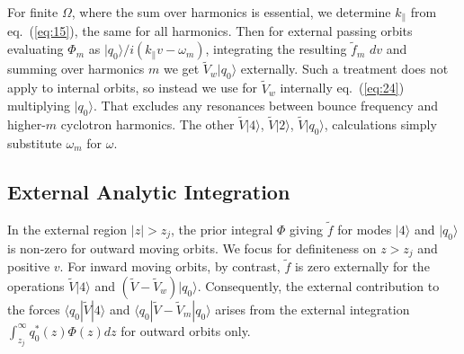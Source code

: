 \documentclass[12pt]{article}
\def\ket#1{|#1\rangle}
\def\bra#1{\langle#1}
\begin{document}
For finite $\Omega$, where the sum over harmonics is essential, we
determine $k_\parallel$ from eq.\ (\ref{eq:15}), the same for all
harmonics. Then for external passing orbits evaluating $\Phi_m$ as
$\ket{q_0}/i(k_\parallel v -\omega_m)$, integrating the resulting
$\tilde f_m$ $dv$ and summing over harmonics $m$ we get
$\tilde V_w\ket{q_0}$ externally. Such a treatment does not
apply to internal orbits, so instead we use for $\tilde V_w$ internally
eq.\ (\ref{eq:24}) multiplying $\ket{q_0}$. That excludes any resonances
between bounce frequency and higher-$m$ cyclotron harmonics. The other
$\tilde V\ket{4}$, $\tilde V\ket{2}$, $\tilde V\ket{q_0}$, calculations
simply substitute $\omega_m$ for $\omega$.

\subsection{External Analytic Integration}

In the external region $|z|>z_j$, the prior integral $\Phi$ giving
$\tilde f$ for modes $\ket{4}$ and $\ket{q_0}$ is non-zero for outward
moving orbits. We focus for definiteness on $z>z_j$ and positive $v$.
For inward moving orbits, by contrast, $\tilde f$ is zero externally for the
operations $\tilde V\ket{4}$ and $(\tilde V -\tilde
V_w)\ket{q_0}$. Consequently, the external contribution to the forces
$\bra{q_0}|\tilde V \ket{4}$ and $\bra{q_0}|\tilde V -\tilde V_m\ket{q_0}$
arises from the external integration $\int_{z_j}^\infty q_0^*(z) \Phi(z)
dz$ for outward orbits only.
\end{document}
